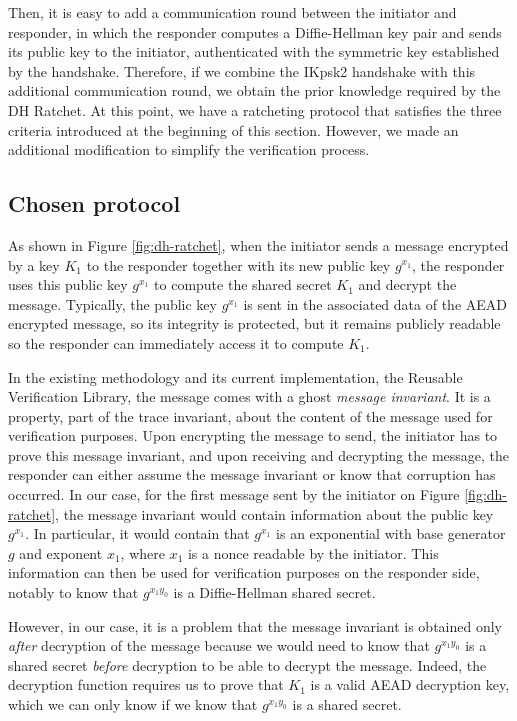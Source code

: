 Then, it is easy to add a communication round between the initiator and responder, in which the responder computes a Diffie-Hellman key pair and sends its public key to the initiator, authenticated with the symmetric key established by the handshake.
Therefore, if we combine the IKpsk2 handshake with this additional communication round, we obtain the prior knowledge required by the DH Ratchet.
At this point, we have a ratcheting protocol that satisfies the three criteria introduced at the beginning of this section. However, we made an additional modification to simplify the verification process.

\subsection{Chosen protocol}
\label{sec:chosen-protocol}

As shown in Figure \ref{fig:dh-ratchet}, when the initiator sends a message encrypted by a key $K_1$ to the responder together with its new public key $g^{x_1}$, the responder uses this public key $g^{x_1}$ to compute the shared secret $K_1$ and decrypt the message.
Typically, the public key $g^{x_1}$ is sent in the associated data of the AEAD encrypted message, so its integrity is protected, but it remains publicly readable so the responder can immediately access it to compute $K_1$.

In the existing methodology and its current implementation, the Reusable Verification Library, the message comes with a ghost \emph{message invariant}. It is a property, part of the trace invariant, about the content of the message used for verification purposes. Upon encrypting the message to send, the initiator has to prove this message invariant, and upon receiving and decrypting the message, the responder can either assume the message invariant or know that corruption has occurred.
In our case, for the first message sent by the initiator on Figure \ref{fig:dh-ratchet}, the message invariant would contain information about the public key $g^{x_1}$. In particular, it would contain that $g^{x_1}$ is an exponential with base generator $g$ and exponent $x_1$, where $x_1$ is a nonce readable by the initiator.
This information can then be used for verification purposes on the responder side, notably to know that $g^{x_1y_0}$ is a Diffie-Hellman shared secret.

However, in our case, it is a problem that the message invariant is obtained only \emph{after} decryption of the message because we would need to know that $g^{x_1y_0}$ is a shared secret \emph{before} decryption to be able to decrypt the message.
Indeed, the decryption function requires us to prove that $K_1$ is a valid AEAD decryption key, which we can only know if we know that $g^{x_1y_0}$ is a shared secret.

